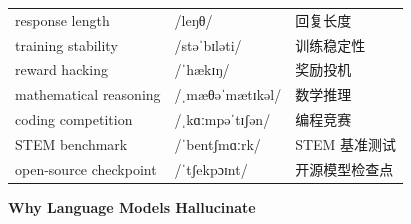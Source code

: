 \documentclass[UTF8,12pt,a4paper]{ctexart}
\providecommand{\zh}[1]{#1}
\begin{document}
\begin{tabular*}{\textwidth}{@{\extracolsep{\fill}}lll@{}}
response length & {\ipafont /leŋθ/} & \zh{回复长度} \\
training stability & {\ipafont /stəˈbɪləti/} & \zh{训练稳定性} \\
reward hacking & {\ipafont /ˈhækɪŋ/} & \zh{奖励投机} \\
mathematical reasoning & {\ipafont /ˌmæθəˈmætɪkəl/} & \zh{数学推理} \\
coding competition & {\ipafont /ˌkɑːmpəˈtɪʃən/} & \zh{编程竞赛} \\
STEM benchmark & {\ipafont /ˈbentʃmɑːrk/} & \zh{STEM 基准测试} \\
open-source checkpoint & {\ipafont /ˈtʃekpɔɪnt/} & \zh{开源模型检查点} \\
\bottomrule
\end{tabular*}

\newpage

\begin{center}
    {\Large\bfseries Why Language Models Hallucinate}
\end{center}
\end{document}

